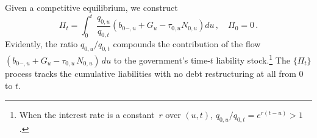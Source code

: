 \documentclass[12pt]{article}
\newcommand{\NW}[1]{{\textcolor{blue}{#1}}}
\newcommand{\WJ}[1]{{\textcolor{red}{#1}}}
\begin{document}
Given a  competitive equilibrium, %
 we construct  %
\begin{equation} \label{Pi}
\Pi_t %
= \int_{0}^t\, \frac{q_{0, u}}{q_{0, t}} \left(b_{0-, u} +G_u-\tau_{0, u} N_{0, u} \right)du \, , \quad  \Pi_0 = 0\, .
\end{equation}   
Evidently, the ratio $q_{0,u}/q_{0,t}$ compounds the contribution of the flow $(b_{0-,u}+G_u-\tau_{0,u}\, N_{0,u})\, du$ to the government's time-$t$ liability stock.\footnote{When the interest rate is a constant~$r$ over $(u,t)$, $q_{0,u}/q_{0,t} = e^{r(t-u)} > 1$.} %
The $\{\Pi_t\}$ process tracks the cumulative liabilities with no debt restructuring at all from $0$ to $t$.  
\end{document}
